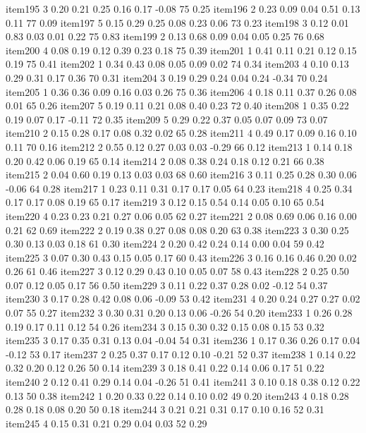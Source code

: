 \documentclass[10pt,man]{apa6}\usepackage{graphicx, color}
\begin{document}
\begin{Schunk}
\begin{Soutput}
item195   3 0.20 0.21 0.25 0.16 0.17 -0.08 75 0.25
item196   2 0.23 0.09 0.04 0.51 0.13  0.11 77 0.09
item197   5 0.15 0.29 0.25 0.08 0.23  0.06 73 0.23
item198   3 0.12 0.01 0.83 0.03 0.01  0.22 75 0.83
item199   2 0.13 0.68 0.09 0.04 0.05  0.25 76 0.68
item200   4 0.08 0.19 0.12 0.39 0.23  0.18 75 0.39
item201   1 0.41 0.11 0.21 0.12 0.15  0.19 75 0.41
item202   1 0.34 0.43 0.08 0.05 0.09  0.02 74 0.34
item203   4 0.10 0.13 0.29 0.31 0.17  0.36 70 0.31
item204   3 0.19 0.29 0.24 0.04 0.24 -0.34 70 0.24
item205   1 0.36 0.36 0.09 0.16 0.03  0.26 75 0.36
item206   4 0.18 0.11 0.37 0.26 0.08  0.01 65 0.26
item207   5 0.19 0.11 0.21 0.08 0.40  0.23 72 0.40
item208   1 0.35 0.22 0.19 0.07 0.17 -0.11 72 0.35
item209   5 0.29 0.22 0.37 0.05 0.07  0.09 73 0.07
item210   2 0.15 0.28 0.17 0.08 0.32  0.02 65 0.28
item211   4 0.49 0.17 0.09 0.16 0.10  0.11 70 0.16
item212   2 0.55 0.12 0.27 0.03 0.03 -0.29 66 0.12
item213   1 0.14 0.18 0.20 0.42 0.06  0.19 65 0.14
item214   2 0.08 0.38 0.24 0.18 0.12  0.21 66 0.38
item215   2 0.04 0.60 0.19 0.13 0.03  0.03 68 0.60
item216   3 0.11 0.25 0.28 0.30 0.06 -0.06 64 0.28
item217   1 0.23 0.11 0.31 0.17 0.17  0.05 64 0.23
item218   4 0.25 0.34 0.17 0.17 0.08  0.19 65 0.17
item219   3 0.12 0.15 0.54 0.14 0.05  0.10 65 0.54
item220   4 0.23 0.23 0.21 0.27 0.06  0.05 62 0.27
item221   2 0.08 0.69 0.06 0.16 0.00  0.21 62 0.69
item222   2 0.19 0.38 0.27 0.08 0.08  0.20 63 0.38
item223   3 0.30 0.25 0.30 0.13 0.03  0.18 61 0.30
item224   2 0.20 0.42 0.24 0.14 0.00  0.04 59 0.42
item225   3 0.07 0.30 0.43 0.15 0.05  0.17 60 0.43
item226   3 0.16 0.16 0.46 0.20 0.02  0.26 61 0.46
item227   3 0.12 0.29 0.43 0.10 0.05  0.07 58 0.43
item228   2 0.25 0.50 0.07 0.12 0.05  0.17 56 0.50
item229   3 0.11 0.22 0.37 0.28 0.02 -0.12 54 0.37
item230   3 0.17 0.28 0.42 0.08 0.06 -0.09 53 0.42
item231   4 0.20 0.24 0.27 0.27 0.02  0.07 55 0.27
item232   3 0.30 0.31 0.20 0.13 0.06 -0.26 54 0.20
item233   1 0.26 0.28 0.19 0.17 0.11  0.12 54 0.26
item234   3 0.15 0.30 0.32 0.15 0.08  0.15 53 0.32
item235   3 0.17 0.35 0.31 0.13 0.04 -0.04 54 0.31
item236   1 0.17 0.36 0.26 0.17 0.04 -0.12 53 0.17
item237   2 0.25 0.37 0.17 0.12 0.10 -0.21 52 0.37
item238   1 0.14 0.22 0.32 0.20 0.12  0.26 50 0.14
item239   3 0.18 0.41 0.22 0.14 0.06  0.17 51 0.22
item240   2 0.12 0.41 0.29 0.14 0.04 -0.26 51 0.41
item241   3 0.10 0.18 0.38 0.12 0.22  0.13 50 0.38
item242   1 0.20 0.33 0.22 0.14 0.10  0.02 49 0.20
item243   4 0.18 0.28 0.28 0.18 0.08  0.20 50 0.18
item244   3 0.21 0.21 0.31 0.17 0.10  0.16 52 0.31
item245   4 0.15 0.31 0.21 0.29 0.04  0.03 52 0.29

\end{Soutput}
\end{Schunk}
\end{document}
